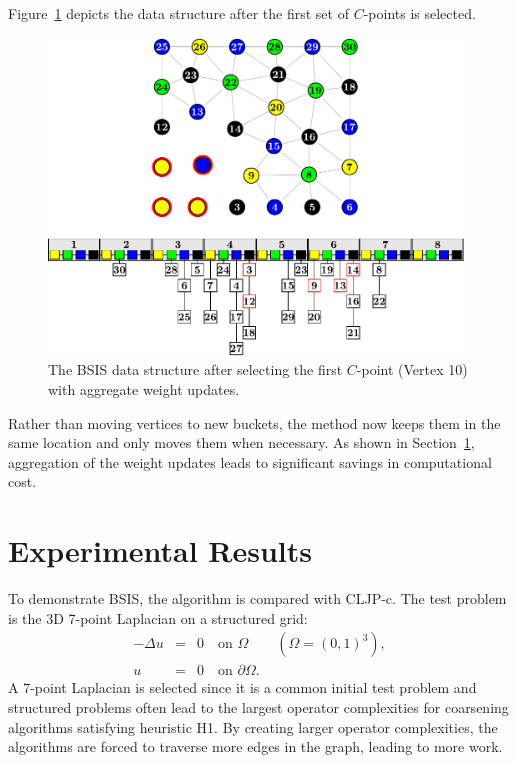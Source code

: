 \documentclass{elsart}
\begin{document}
Figure~\ref{5:fig:cp1-agg} depicts the data structure after the first
set of $C$-points is selected.
\begin{figure}
  \begin{center}
    \includegraphics[width=0.98\textwidth]{images/BSIS/cp1-agg}
    \caption{The BSIS data structure after selecting the first
    $C$-point (Vertex 10) with aggregate weight updates.}
    \label{5:fig:cp1-agg}
  \end{center}
\end{figure}
Rather than moving vertices to new buckets, the method now keeps them
in the same location and only moves them when necessary. As shown in
Section~\ref{5:sec:experiments}, aggregation of the weight updates
leads to significant savings in computational cost.

\section{Experimental Results}
\label{5:sec:experiments}
To demonstrate BSIS, the algorithm is compared with CLJP-c. The test
problem is the 3D 7-point Laplacian on a structured grid:
\begin{eqnarray}
\label{5:eqn:Lap} -\Delta u & = & 0 \quad \textrm{on } \Omega \qquad
(\Omega = (0, 1)^3),\\
\nonumber u & = & 0 \quad \textrm{on } \partial \Omega.
\end{eqnarray}
A 7-point Laplacian is selected since it is a common initial test
problem and structured problems often lead to the largest operator
complexities for coarsening algorithms satisfying heuristic H1. By
creating larger operator complexities, the algorithms are forced to
traverse more edges in the graph, leading to more work.
\end{document}

